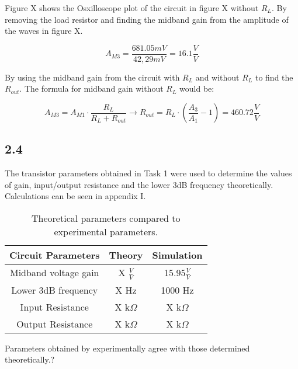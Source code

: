 	Figure X shows the Osxilloscope plot of the circuit in figure X without $R_{L}$. By removing the load resistor and finding the midband gain from the amplitude of the waves in figure X.


	$$ A_{M3} = \frac{681.05 mV}{42,29 mV} = 16.1 \frac{V}{V} $$

	By using the midband gain from the circuit with $R_{L}$ and without $R_{L}$ to find the $R_{out}$. The formula for midband gain without $R_{L}$ would be:


	$$ A_{M3} = A_{M1} \cdot \frac{R_{L}}{R_{L} + R_{out}} \rightarrow R_{out} = R_{L} \cdot (\frac{A_{3}}{A_{1}}-1) = 460.72 \frac{V}{V}$$






\subsection*{2.4}

The transistor parameters obtained in Task 1 were used to determine the values of gain, input/output resistance and the lower 3dB frequency theoretically. Calculations can be seen in appendix I.\\

\begin{table}[htbp]
    \centering
        \begin{tabular}{ c | c | c }
        \hline
        Circuit Parameters     &   Theory                  & Simulation \\
        \hline
        Midband voltage gain    &   X $\frac{V}{V}$    &   15.95$\frac{V}{V}$\\
        Lower 3dB frequency     &   X Hz                &   1000 Hz\\
        Input Resistance        &   X k$\Omega$           &   X k$\Omega$\\
        Output Resistance       &   X k$\Omega$            &   X k$\Omega$\\
        \end{tabular}%
    \caption{Theoretical parameters compared to experimental parameters.}
    \label{tab:addlabel}%
\end{table}%

Parameters obtained by experimentally agree with those determined theoretically.?
